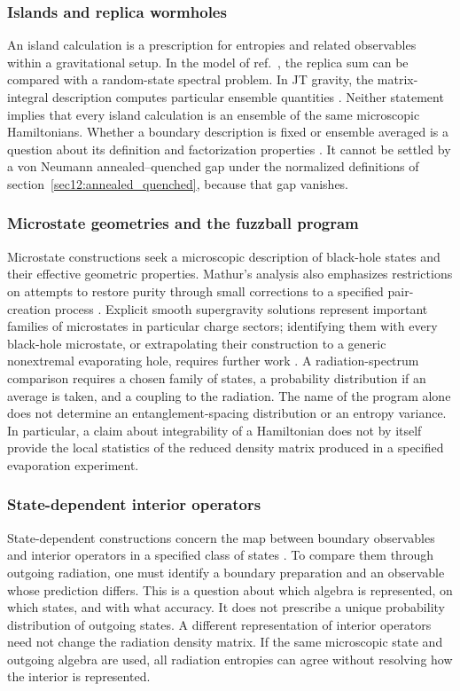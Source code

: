 \documentclass[11pt,letterpaper]{article}
\theoremstyle{plain}
\theoremstyle{definition}
\theoremstyle{remark}
\begin{document}
\subsubsection{Islands and replica wormholes}
\label{subsec13:island}
An island calculation is a prescription for entropies and related
observables within a gravitational setup. In the model of
ref.~\cite{pssyetal2022}, the replica sum can be compared with a
random-state spectral problem. In JT gravity, the matrix-integral
description computes particular ensemble quantities
\cite{saadetal2019}. Neither statement implies that every island
calculation is an ensemble of the same microscopic Hamiltonians.
Whether a boundary description is fixed or ensemble averaged is a
question about its definition and factorization properties
\cite{marolfmaxfield2020}. It cannot be settled by a von Neumann
annealed--quenched gap under the normalized definitions of
section~\ref{sec12:annealed_quenched}, because that gap vanishes.

\subsubsection{Microstate geometries and the fuzzball program}
\label{subsec13:fuzzball}
Microstate constructions seek a microscopic description of black-hole
states and their effective geometric properties. Mathur's analysis also
emphasizes restrictions on attempts to restore purity through small
corrections to a specified pair-creation process \cite{mathur2009}.
Explicit smooth supergravity solutions represent important families of
microstates in particular charge sectors; identifying them with every
black-hole microstate, or extrapolating their construction to a generic
nonextremal evaporating hole, requires further work
\citep{mathur2005,benawarner2008}. A radiation-spectrum comparison
requires a chosen family of states,
a probability distribution if an average is taken, and a coupling to
the radiation. The name of the program alone does not determine an
entanglement-spacing distribution or an entropy variance. In
particular, a claim about integrability of a Hamiltonian does not by
itself provide the local statistics of the reduced density matrix
produced in a specified evaporation experiment.

\subsubsection{State-dependent interior operators}
\label{subsec13:state_dependent}
State-dependent constructions concern the map between boundary
observables and interior operators in a specified class of states
\cite{papadodimasraju2013}. To compare them through outgoing radiation,
one must identify a boundary preparation and an observable whose
prediction differs. This is a question about which algebra is represented, on which states,
and with what accuracy. It does not prescribe a unique probability
distribution of outgoing states. A different representation of interior operators
need not change the radiation density matrix. If the same microscopic
state and outgoing algebra are used, all radiation entropies can agree
without resolving how the interior is represented.
\end{document}
